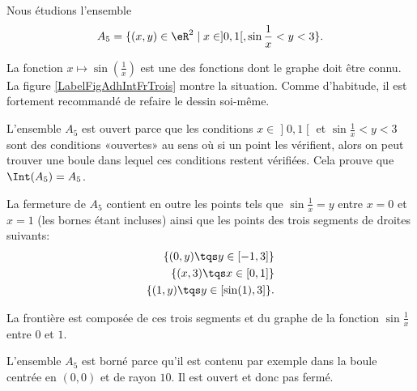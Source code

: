 \begin{example}
    Nous étudions l'ensemble
    \begin{equation}
        A_5 = \{ (x, y ) \in \eR^2 \; | \; x \in ]0, 1[, \sin \frac 1x < y < 3 \}.
    \end{equation}

			La fonction $x\mapsto\sin(\frac{1}{ x })$ est une des fonctions dont le graphe doit être connu. La figure \ref{LabelFigAdhIntFrTrois} montre la situation. Comme d'habitude, il est fortement recommandé de refaire le dessin soi-même.
\newcommand{\CaptionFigAdhIntFrTrois}{Les points qui dont sur l'axe vertical entre $0$ et $3$ sont sur la frontière, mais pas dans l'ensemble $A_5$.}


			L'ensemble $A_5$ est ouvert parce que les conditions $x\in\mathopen] 0 , 1 \mathclose[$ et $\sin\frac{1}{ x }<y<3$ sont des conditions «ouvertes» au sens où si un point les vérifient, alors on peut trouver une boule dans lequel ces conditions restent vérifiées. Cela prouve que $\Int(A_5)=A_5$.

			La fermeture de $A_5$ contient en outre les points tels que $\sin\frac{1}{ x }=y$ entre $x=0$ et $x=1$ (les bornes étant incluses) ainsi que les points des trois segments de droites suivants:
			\begin{equation}
				\begin{aligned}[]
					\{ (0,y)\tqs y\in\mathopen[ -1 , 3 \mathclose] \}\\
					\{ (x,3)\tqs x\in\mathopen[ 0 , 1 \mathclose] \}\\
					\{ (1,y)\tqs y\in\mathopen[ \sin(1) , 3 \mathclose] \}.
				\end{aligned}
			\end{equation}

			La frontière est composée de ces trois segments et du graphe de la fonction $\sin\frac{1}{ x }$ entre $0$ et $1$.

			L'ensemble $A_5$ est borné parce qu'il est contenu par exemple dans la boule centrée en $(0,0)$ et de rayon $10$. Il est ouvert et donc pas fermé.
\end{example}


